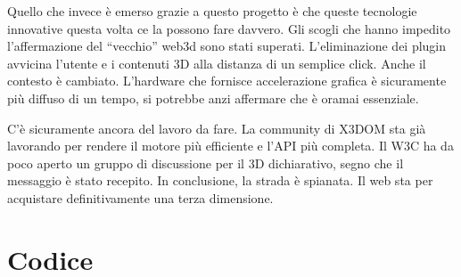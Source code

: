 \documentclass[a4paper,12pt]{report}
\begin{document}
Quello che invece è emerso grazie a questo progetto è che queste tecnologie innovative questa volta ce la possono fare davvero. Gli scogli che hanno impedito l'affermazione del ``vecchio'' web3d sono stati superati. L'eliminazione dei plugin avvicina l'utente e i contenuti 3D alla distanza di un semplice click. Anche il contesto è cambiato. L'hardware che fornisce accelerazione grafica è sicuramente più diffuso di un tempo, si potrebbe anzi affermare che è oramai essenziale.

C'è sicuramente ancora del lavoro da fare. La community di X3DOM sta già lavorando per rendere il motore più efficiente e l'API più completa. Il W3C ha da poco aperto un gruppo di discussione per il 3D dichiarativo, segno che il messaggio è stato recepito. In conclusione, la strada è spianata. Il web sta per acquistare definitivamente una terza dimensione.
\newpage
{}
\begin{thebibliography}{99}


\end{thebibliography}
\appendix
\linespread{1}
\chapter{Codice}

\def\baselinestretch{0.7}
\def\baselinestretch{1}
\end{document}
